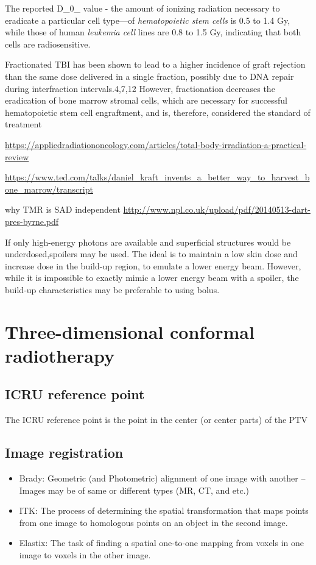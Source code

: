 \documentclass[]{book}
\providecommand{\tightlist}{%
  \setlength{\itemsep}{0pt}\setlength{\parskip}{0pt}}
\theoremstyle{definition}
\theoremstyle{definition}
\theoremstyle{definition}
\theoremstyle{remark}
\begin{document}
The reported D\_0\_ value - the amount of ionizing radiation necessary
to eradicate a particular cell type---of \emph{hematopoietic stem cells}
is 0.5 to 1.4 Gy, while those of human \emph{leukemia cell} lines are
0.8 to 1.5 Gy, indicating that both cells are radiosensitive.

Fractionated TBI has been shown to lead to a higher incidence of graft
rejection than the same dose delivered in a single fraction, possibly
due to DNA repair during interfraction intervals.4,7,12 However,
fractionation decreases the eradication of bone marrow stromal cells,
which are necessary for successful hematopoietic stem cell engraftment,
and is, therefore, considered the standard of treatment

\url{https://appliedradiationoncology.com/articles/total-body-irradiation-a-practical-review}

\url{https://www.ted.com/talks/daniel_kraft_invents_a_better_way_to_harvest_bone_marrow/transcript}

why TMR is SAD independent
\url{http://www.npl.co.uk/upload/pdf/20140513-dart-pres-byrne.pdf}

If only high-energy photons are available and superficial structures
would be underdosed,spoilers may be used. The ideal is to maintain a low
skin dose and increase dose in the build-up region, to emulate a lower
energy beam. However, while it is impossible to exactly mimic a lower
energy beam with a spoiler, the build-up characteristics may be
preferable to using bolus.

\chapter{Three-dimensional conformal radiotherapy}\label{crt}

\section{ICRU reference point}\label{icru-reference-point}

The ICRU reference point is the point in the center (or center parts) of
the PTV

\section{Image registration}\label{image-registration}

\begin{itemize}
\tightlist
\item
  Brady: Geometric (and Photometric) alignment of one image with another
  -- Images may be of same or different types (MR, CT, and etc.)
\item
  ITK: The process of determining the spatial transformation that maps
  points from one image to homologous points on an object in the second
  image.
\item
  Elastix: The task of finding a spatial one-to-one mapping from voxels
  in one image to voxels in the other image.
\end{itemize}
\end{document}
